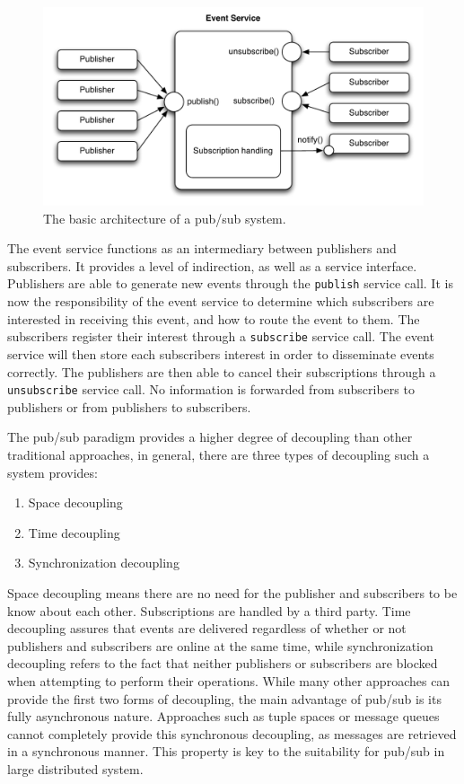 \begin{figure}
\centering
\includegraphics[width=\textwidth]{figures/pubsubarch}
\caption{The basic architecture of a pub/sub system.}
\label{fig:pubsubarch}
\end{figure}

The event service functions as an intermediary between publishers and
subscribers. It provides a level of indirection, as well as a service
interface. Publishers are able to generate new events through the
\texttt{publish} service call. It is now the responsibility of the event
service to determine which subscribers are interested in receiving this
event, and how to route the event to them. The subscribers register
their interest through a \texttt{subscribe} service call. The event
service will then store each subscribers interest in order to
disseminate events correctly. The publishers are then able to cancel
their subscriptions through a \texttt{unsubscribe} service call. No
information is forwarded from subscribers to publishers or from
publishers to subscribers.

The pub/sub paradigm provides a higher degree of decoupling than other
traditional approaches, in general, there are three types of decoupling
such a system provides:

\begin{enumerate}
    \item Space decoupling
    \item Time decoupling
    \item Synchronization decoupling
\end{enumerate}

Space decoupling means there are no need for the publisher and
subscribers to be know about each other. Subscriptions are handled by a
third party. Time decoupling assures that events are delivered
regardless of whether or not publishers and subscribers are online at
the same time, while synchronization decoupling refers to the fact that
neither publishers or subscribers are blocked when attempting to perform
their operations. While many other approaches can provide the first two forms of
decoupling, the main advantage of pub/sub is its fully asynchronous nature.
Approaches such as tuple spaces or message queues cannot completely
provide this synchronous decoupling, as messages are retrieved in a
synchronous manner. This property is key to the suitability for pub/sub
in large distributed system.~\cite{Eugster:2003}

